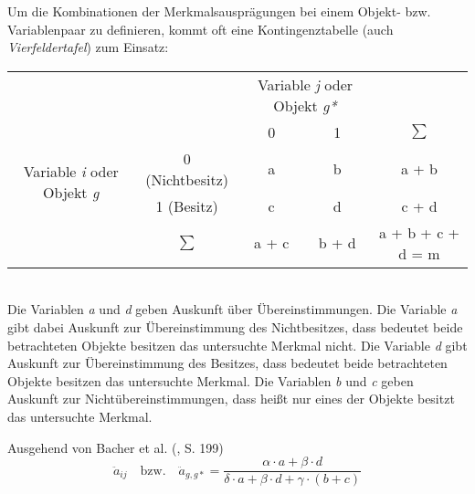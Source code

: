 Um die Kombinationen der Merkmalsausprägungen bei einem Objekt- bzw. Variablenpaar zu definieren, kommt oft eine Kontingenztabelle (auch \textit{Vierfeldertafel}) zum Einsatz: \\

\begin{tabular}{cc|cc|c}
	& & \multicolumn{2}{c|}{Variable \textit{j} oder Objekt \textit{g*}} & \\ 
	& & 0 & 1 & $\sum$ \\ \hline
	\multirow{2}{*}{Variable \textit{i} oder Objekt \textit{g}} & 0 (Nichtbesitz) & a & b & a + b \\
	& 1 (Besitz) & c & d & c + d \\ \hline
	& $\sum$ & a + c & b + d & a + b + c + d = m \\ 
\end{tabular}
\bigskip
\\
Die Variablen \textit{a} und \textit{d} geben Auskunft über Übereinstimmungen. Die Variable \textit{a} gibt dabei Auskunft zur Übereinstimmung des Nichtbesitzes, dass bedeutet beide betrachteten Objekte besitzen das untersuchte Merkmal nicht. Die Variable \textit{d} gibt Auskunft zur Übereinstimmung des Besitzes, dass bedeutet beide betrachteten Objekte besitzen das untersuchte Merkmal. Die Variablen \textit{b} und \textit{c} geben Auskunft zur Nichtübereinstimmungen, dass heißt nur eines der Objekte besitzt das untersuchte Merkmal.

Ausgehend von Bacher et al. (\cite{Bacher.2010}, S. 199)
\begin{equation}
\ddot{a}_{ij} \quad \text{bzw.} \quad \ddot{a}_{g,g*} = \frac{\alpha \cdot a + \beta \cdot d}{\delta \cdot a + \beta \cdot d + \gamma \cdot (b + c)}
\end{equation}

